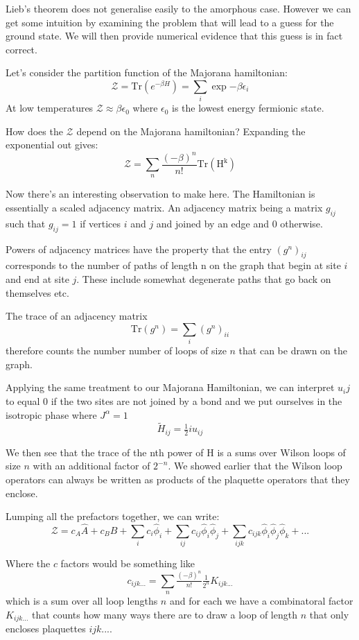 Lieb's theorem does not generalise easily to the amorphous case. However
we can get some intuition by examining the problem that will lead to a
guess for the ground state. We will then provide numerical evidence that
this guess is in fact correct.

Let's consider the partition function of the Majorana hamiltonian:
\[ \mathcal{Z} = \mathrm{Tr}\left( e^{-\beta H}\right) = \sum_i \exp{-\beta \epsilon_i}\]
At low temperatures \(\mathcal{Z} \approx \beta \epsilon_0\) where
\(\epsilon_0\) is the lowest energy fermionic state.

How does the \(\mathcal{Z}\) depend on the Majorana hamiltonian?
Expanding the exponential out gives:
\[ \mathcal{Z} = \sum_n \frac{(-\beta)^n}{n!} \mathrm{Tr(H^k)} \]

Now there's an interesting observation to make here. The Hamiltonian is
essentially a scaled adjacency matrix. An adjacency matrix being a
matrix \(g_{ij}\) such that \(g_{ij} = 1\) if vertices \(i\) and \(j\)
and joined by an edge and 0 otherwise.

Powers of adjacency matrices have the property that the entry
\((g^n)_{ij}\) corresponds to the number of paths of length n on the
graph that begin at site \(i\) and end at site \(j\). These include
somewhat degenerate paths that go back on themselves etc.

The trace of an adjacency matrix
\[\mathrm{Tr}(g^n) = \sum_i (g^n)_{ii}\] therefore counts the number
number of loops of size \(n\) that can be drawn on the graph.

Applying the same treatment to our Majorana Hamiltonian, we can
interpret \(u_ij\) to equal 0 if the two sites are not joined by a bond
and we put ourselves in the isotropic phase where \(J^\alpha = 1\)
\[ \tilde{H}_{ij} =  \tfrac{1}{2} i u_{ij}\]

We then see that the trace of the nth power of H is a sums over Wilson
loops of size \(n\) with an additional factor of \(2^{-n}\). We showed
earlier that the Wilson loop operators can always be written as products
of the plaquette operators that they enclose.

Lumping all the prefactors together, we can write:
\[ \mathcal{Z} = c_A \hat{A} + c_B \hat{B} + \sum_i c_i \hat{\phi}_i + \sum_{ij} c_{ij}  \hat{\phi}_i \hat{\phi}_j + \sum_{ijk} c_{ijk}  \hat{\phi}_i \hat{\phi}_j \hat{\phi}_k + ...\]

Where the \(c\) factors would be something like
\[c_{ijk...} = \sum_n \tfrac{(-\beta)^n}{n!} \tfrac{1}{2^n} K_{ijk...}\]
which is a sum over all loop lengths \(n\) and for each we have a
combinatoral factor \(K_{ijk...}\) that counts how many ways there are
to draw a loop of length \(n\) that only encloses plaquettes \(ijk...\).

